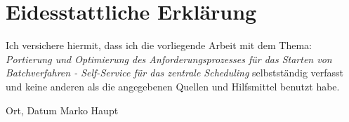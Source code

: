 \section*{Eidesstattliche Erklärung}

	Ich versichere hiermit, dass ich die vorliegende Arbeit mit dem Thema: \textit{Portierung und Optimierung des Anforderungsprozesses für das Starten von Batchverfahren - Self-Service für das zentrale Scheduling} selbstständig verfasst und keine anderen als die angegebenen Quellen und Hilfsmittel benutzt habe.

	\vspace{3cm}
	Ort, Datum \hspace{11cm} Marko Haupt